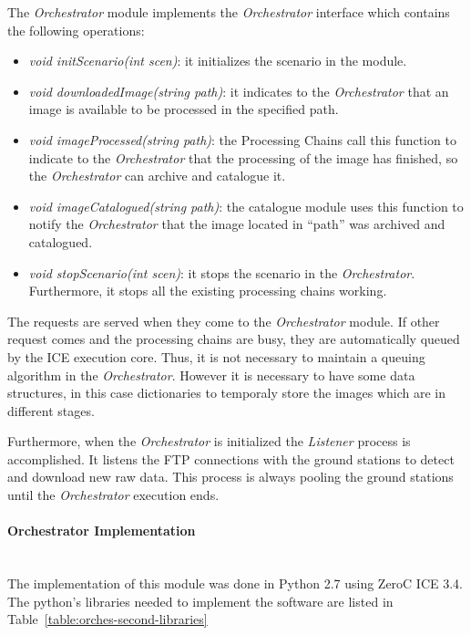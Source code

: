 The \emph{Orchestrator} module implements the \emph{Orchestrator} interface
which contains the following operations:
\begin{itemize}
\item \emph{void initScenario(int scen)}: it initializes the scenario in the
  module.
\item \emph{void downloadedImage(string path)}: it indicates to the
  \emph{Orchestrator} that an image is available to be processed  in the specified
  path.
\item \emph{void imageProcessed(string path)}: the Processing Chains call this function
  to indicate to the \emph{Orchestrator} that the processing of the image has
  finished, so the \emph{Orchestrator} can archive and catalogue it.
\item \emph{void imageCatalogued(string path)}: the catalogue module uses this
  function to notify the \emph{Orchestrator} that the image located in ``path'' was
  archived and catalogued.
\item \emph{void stopScenario(int scen)}: it stops the scenario in the
  \emph{Orchestrator}. Furthermore, it stops all the existing processing chains working.
\end{itemize}

The requests are served when they come to the \emph{Orchestrator} module. If
other request comes and the processing chains are busy, they are automatically queued by the
ICE execution core. Thus, it is not necessary to maintain a queuing algorithm in
the \emph{Orchestrator}. However it is necessary to have some data structures, in
this case dictionaries to temporaly store the images which are in different stages.

Furthermore, when the \emph{Orchestrator} is initialized the \emph{Listener} process is
accomplished. It listens the \ac{FTP} connections with the ground stations to detect and download new raw data. This process is always pooling the
ground stations until the \emph{Orchestrator} execution ends.

\paragraph{Orchestrator Implementation}~\\

The implementation of this module was done in Python 2.7 using ZeroC ICE 3.4. The
python's libraries needed to implement the software are listed in
Table~\ref{table:orches-second-libraries}

